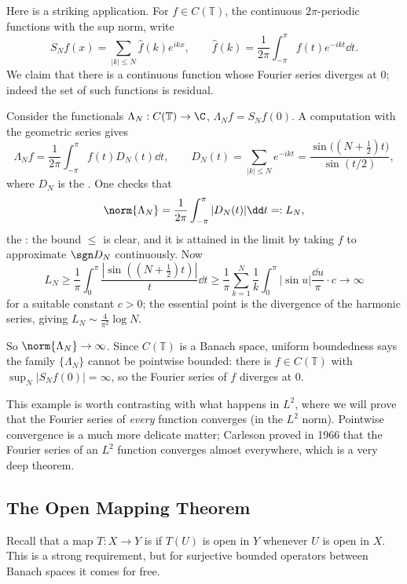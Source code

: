 \begin{example}
	Here is a striking application. For $f \in C(\mathbb{T})$, the continuous $2\pi$-periodic functions with the sup norm, write
	$$S_N f(x) = \sum_{|k| \leq N} \hat f(k) e^{ikx}, \qquad \hat f(k) = \frac{1}{2\pi}\int_{-\pi}^{\pi} f(t)e^{-ikt}\dd t.$$
	We claim that there is a continuous function whose Fourier series diverges at $0$; indeed the set of such functions is residual.

	Consider the functionals $\Lambda_N : C(\mathbb{T}) \to \C$, $\Lambda_N f = S_Nf(0)$. A computation with the geometric series gives
	$$\Lambda_N f = \frac{1}{2\pi}\int_{-\pi}^\pi f(t) D_N(t) \dd t, \qquad D_N(t) = \sum_{|k|\leq N}e^{-ikt} = \frac{\sin\big((N+\frac12)t\big)}{\sin(t/2)},$$
	where $D_N$ is the . One checks that
	$$\norm{\Lambda_N} = \frac{1}{2\pi}\int_{-\pi}^{\pi}|D_N(t)|\dd t =: L_N,$$
	the : the bound $\leq$ is clear, and it is attained in the limit by taking $f$ to approximate $\sgn D_N$ continuously. Now
	$$L_N \geq \frac{1}{\pi}\int_0^{\pi} \frac{|\sin((N+\frac12)t)|}{t}\dd t \geq \frac{1}{\pi}\sum_{k=1}^{N}\frac{1}{k}\int_{0}^{\pi}|\sin u| \frac{\dd u}{\pi} \cdot c \longrightarrow \infty$$
	for a suitable constant $c > 0$; the essential point is the divergence of the harmonic series, giving $L_N \sim \frac{4}{\pi^2}\log N$.

	So $\norm{\Lambda_N} \to \infty$. Since $C(\mathbb{T})$ is a Banach space, uniform boundedness says the family $\{\Lambda_N\}$ cannot be pointwise bounded: there is $f \in C(\mathbb{T})$ with $\sup_N |S_Nf(0)| = \infty$, so the Fourier series of $f$ diverges at $0$.
\end{example}

\begin{remark}
	This example is worth contrasting with what happens in $L^2$, where we will prove that the Fourier series of \emph{every} function converges (in the $L^2$ norm). Pointwise convergence is a much more delicate matter; Carleson proved in 1966 that the Fourier series of an $L^2$ function converges almost everywhere, which is a very deep theorem.
\end{remark}

\subsection{The Open Mapping Theorem}

Recall that a map $T : X \to Y$ is  if $T(U)$ is open in $Y$ whenever $U$ is open in $X$. This is a strong requirement, but for surjective bounded operators between Banach spaces it comes for free.


